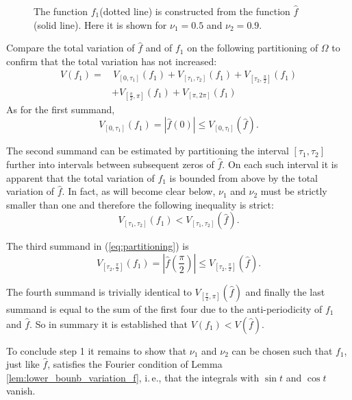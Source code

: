\documentclass{article}
\newcommand{\ite}{i.\,e.\xspace}
\newif\ifcolor
\begin{document}
\begin{figure}

    \caption{The function $f_1$\ifcolor (blue dotted line) \else (dotted line) \fi is constructed from the function $\hat f$ \ifcolor (orange line)\else (solid line)\fi. Here it is shown for $\nu_1 = 0.5$ and $\nu_2 = 0.9$.}
    \label{fig:plot_f_f1}
\end{figure}

Compare the total variation of $\hat f$ and of $f_1$ on the following  partitioning of $\Omega$ to confirm that the total variation has not increased:
\begin{equation}
    \begin{split} \label{eq:partitioning}
        V(f_1) = &\, V_{[0,\tau_1]}(f_1) + V_{[\tau_1, \tau_2]}(f_1) +  V_{[\tau_2,\frac{\pi}{2}]}(f_1)\\
        &+ V_{[\frac{\pi}{2},\pi]}(f_1) + V_{[\pi,2\pi]}(f_1)
    \end{split}
\end{equation}
As for the first summand, 
\[V_{[0,\tau_1]}(f_1) = |\hat f(0)|\le V_{[0,\tau_l]}(\hat f).\]

The second summand can be estimated by partitioning the interval $[\tau_1, \tau_2]$ further into intervals between subsequent zeros of $\hat f$.
On each such interval it is apparent that the total variation of $f_1$ is bounded from above by the total variation of $\hat f$. In fact, as will become clear below, $\nu_1$ and $\nu_2$ must be strictly smaller than one and therefore the following inequality is strict: 
\[V_{[\tau_1, \tau_2]}(f_1) < V_{[\tau_1, \tau_2]}(\hat f).\]

The third summand in (\ref{eq:partitioning}) is
\[V_{[\tau_2,\frac{\pi}{2}]}(f_1) = |\hat f(\frac{\pi}{2})| \le V_{[\tau_2,\frac{\pi}{2}]}(\hat f).\]

The fourth summand is trivially identical to $V_{[\frac{\pi}{2},\pi]}(\hat f)$ and finally the last summand is equal to the sum of the first four due to the anti-periodicity of $f_1$ and $\hat f$. So in summary it is established that $V(f_1) < V(\hat f)$.

To conclude step 1 it remains to show that $\nu_1$ and $\nu_2$ can be chosen such that $f_1$, just like $\hat f$, satisfies the Fourier condition of Lemma \ref{lem:lower_bounb_variation_f}, \ite, that the integrals with $\sin t$ and $\cos t$ vanish.
\end{document}
